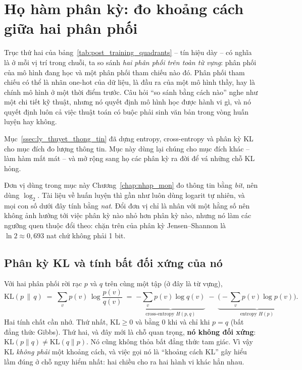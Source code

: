 
\section{Họ hàm phân kỳ: đo khoảng cách giữa hai phân phối}
\label{sec:divergences}

Trục thứ hai của bảng~\ref{tab:post_training_quadrants} -- tín hiệu dày -- có nghĩa là ở mỗi vị trí trong chuỗi, ta so sánh \emph{hai phân phối trên toàn từ vựng}: phân phối của mô hình đang học và một phân phối tham chiếu nào đó. Phân phối tham chiếu có thể là nhãn one-hot của dữ liệu, là đầu ra của một mô hình thầy, hay là chính mô hình ở một thời điểm trước. Câu hỏi ``so sánh bằng cách nào'' nghe như một chi tiết kỹ thuật, nhưng nó quyết định mô hình học được hành vi gì, và nó quyết định luôn cả việc thuật toán có buộc phải sinh văn bản trong vòng huấn luyện hay không.

Mục~\ref{ssec:ly_thuyet_thong_tin} đã dựng entropy, cross-entropy và phân kỳ KL cho mục đích đo lượng thông tin. Mục này dùng lại chúng cho mục đích khác -- làm hàm mất mát -- và mở rộng sang họ các phân kỳ ra đời để vá những chỗ KL hỏng.

\begin{pitfall}{Đơn vị dùng trong mục này}
Chương~\ref{chap:nhap_mon} đo thông tin bằng \emph{bit}, nên dùng $\log_2$. Tài liệu về huấn luyện thì gần như luôn dùng logarit tự nhiên, và mọi con số dưới đây tính bằng \emph{nat}. Đổi đơn vị chỉ là nhân với một hằng số nên không ảnh hưởng tới việc phân kỳ nào nhỏ hơn phân kỳ nào, nhưng nó làm các ngưỡng quen thuộc đổi theo: chặn trên của phân kỳ Jensen--Shannon là $\ln 2 \approx 0{,}693$ nat chứ không phải 1 bit.
\end{pitfall}

\subsection{Phân kỳ KL và tính bất đối xứng của nó}
\label{ssec:kl_asymmetry}

Với hai phân phối rời rạc $p$ và $q$ trên cùng một tập (ở đây là từ vựng),
\[
\mathrm{KL}(p \,\|\, q) \;=\; \sum_{v} p(v)\,\log\frac{p(v)}{q(v)}
\;=\; \underbrace{-\sum_v p(v)\log q(v)}_{\text{cross-entropy } H(p,q)} \;-\; \underbrace{\Big(-\sum_v p(v)\log p(v)\Big)}_{\text{entropy } H(p)} .
\]
Hai tính chất cần nhớ. Thứ nhất, $\mathrm{KL} \ge 0$ và bằng 0 khi và chỉ khi $p = q$ (bất đẳng thức Gibbs). Thứ hai, và đây mới là chỗ quan trọng, \textbf{nó không đối xứng}: $\mathrm{KL}(p\|q) \ne \mathrm{KL}(q\|p)$. Nó cũng không thỏa bất đẳng thức tam giác. Vì vậy KL \emph{không phải} một khoảng cách, và việc gọi nó là ``khoảng cách KL'' gây hiểu lầm đúng ở chỗ nguy hiểm nhất: hai chiều cho ra hai hành vi khác hẳn nhau.

